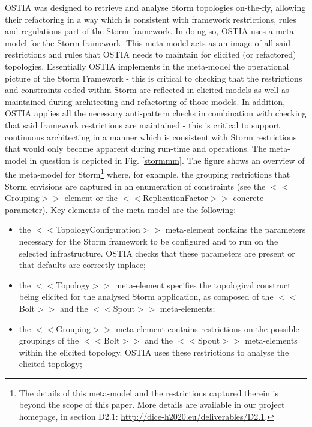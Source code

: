 OSTIA was designed to retrieve and analyse Storm topologies on-the-fly, allowing their refactoring in a way which is consistent with framework restrictions, rules and regulations part of the Storm framework. In doing so, OSTIA uses a meta-model for the Storm framework. This meta-model acts as an image of all said restrictions and rules that OSTIA needs to maintain for elicited (or refactored) topologies. 
Essentially OSTIA implements in the meta-model the operational picture of the Storm Framework - this is critical to checking that the restrictions and constraints coded within Storm are reflected in elicited models as well as maintained during architecting and refactoring of those models. In addition, OSTIA applies all the necessary anti-pattern checks in combination with checking that said framework restrictions are maintained - this is critical to support continuous architecting in a manner which is consistent with Storm restrictions that would only become apparent during run-time and operations.
The meta-model in question is depicted in Fig. \ref{stormmm}. The figure shows an overview of the meta-model for Storm\footnote{The details of this meta-model and the restrictions captured therein is beyond the scope of this paper. More details are available in our project homepage, in section D2.1: \url{http://dice-h2020.eu/deliverables/D2.1}.} where, for example, the grouping restrictions that Storm envisions are captured in an enumeration of constraints (see the $<<$Grouping$>>$ element or the $<<$ReplicationFactor$>>$ concrete parameter). Key elements of the meta-model are the following:
\begin{itemize}
\item the $<<$TopologyConfiguration$>>$ meta-element contains the parameters necessary for the Storm framework to be configured and to run on the selected infrastructure. OSTIA checks that these parameters are present or that defaults are correctly inplace;
\item the $<<$Topology$>>$ meta-element specifies the topological construct being elicited for the analysed Storm application, as composed of the $<<$Bolt$>>$ and  the $<<$Spout$>>$ meta-elements;
\item  the $<<$Grouping$>>$ meta-element contains restrictions on the possible groupings of the $<<$Bolt$>>$ and the $<<$Spout$>>$ meta-elements within the elicited topology. OSTIA uses these restrictions to analyse the elicited topology;
\end{itemize}

